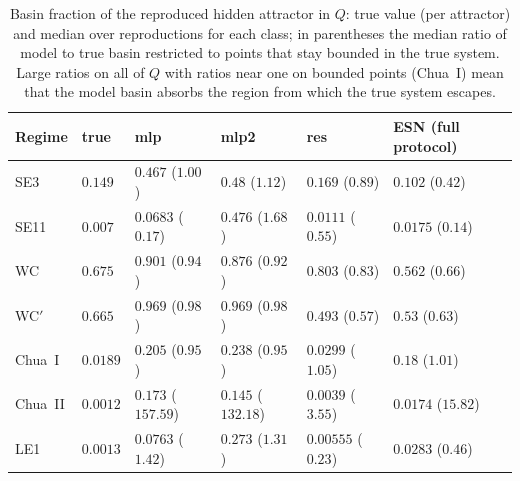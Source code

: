 \begin{table}
\caption{Basin fraction of the reproduced hidden attractor in $Q$: true value (per attractor) and median over reproductions
for each class; in parentheses the median ratio of model to true basin restricted to points that stay bounded in the true
system. Large ratios on all of $Q$ with ratios near one on bounded points (Chua~I) mean that the model basin absorbs the
region from which the true system escapes.}
\label{tab:sm_pB}
\begin{ruledtabular}
\begin{tabular}{llllll}
Regime & true & mlp & mlp2 & res & ESN (full protocol) \\
\hline
SE3 & $0.149$ & $0.467$ ($1.00$) & $0.48$ ($1.12$) & $0.169$ ($0.89$) & $0.102$ ($0.42$) \\
SE11 & $0.007$ & $0.0683$ ($0.17$) & $0.476$ ($1.68$) & $0.0111$ ($0.55$) & $0.0175$ ($0.14$) \\
WC & $0.675$ & $0.901$ ($0.94$) & $0.876$ ($0.92$) & $0.803$ ($0.83$) & $0.562$ ($0.66$) \\
WC$'$ & $0.665$ & $0.969$ ($0.98$) & $0.969$ ($0.98$) & $0.493$ ($0.57$) & $0.53$ ($0.63$) \\
Chua~I & $0.0189$ & $0.205$ ($0.95$) & $0.238$ ($0.95$) & $0.0299$ ($1.05$) & $0.18$ ($1.01$) \\
Chua~II & $0.0012$ & $0.173$ ($157.59$) & $0.145$ ($132.18$) & $0.0039$ ($3.55$) & $0.0174$ ($15.82$) \\
LE1 & $0.0013$ & $0.0763$ ($1.42$) & $0.273$ ($1.31$) & $0.00555$ ($0.23$) & $0.0283$ ($0.46$) \\
\end{tabular}
\end{ruledtabular}
\end{table}
